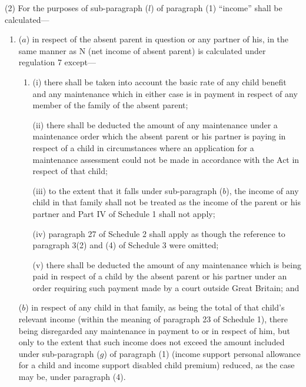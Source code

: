 \documentclass[12pt,a4paper]{article}
\begin{document}
(2) For the purposes of sub-paragraph ($l$) of paragraph (1) “income” shall be calculated—
\begin{enumerate}\item[]
($a$) in respect of the absent parent in question or any partner of his, in the same manner as N (net income of absent parent) is calculated under regulation 7 except—
\begin{enumerate}\item[]
(i) there shall be taken into account the basic rate of any child benefit and any maintenance which in either case is in payment in respect of any member of the family of the absent parent;

(ii) there shall be deducted the amount of any maintenance under a maintenance order which the absent parent or his partner is paying in respect of a child in circumstances where an application for a maintenance assessment could not be made in accordance with the Act in respect of that child; 

(iii) to the extent that it falls under sub-paragraph ($b$), the income of any child in that family shall not be treated as the income of the parent or his partner and Part IV of Schedule 1 shall not apply; 

(iv) paragraph 27 of Schedule 2 shall apply as though the reference to paragraph 3(2) and (4) of Schedule 3 were omitted;

(v) there shall be deducted the amount of any maintenance which is being paid in respect of a child by the absent parent or his partner under an order requiring such payment made by a court outside Great Britain; and
\end{enumerate}

($b$) in respect of any child in that family, as being the total of 
that child’s relevant income (within the meaning of paragraph 23 of Schedule 1), there being disregarded any maintenance in payment to or in respect of him,  %
but only to the extent that such income does not exceed the amount included under sub-paragraph ($g$) of paragraph (1) (income support personal allowance for a child and income support disabled child premium) reduced, as the case may be, under paragraph (4).
\end{enumerate}
\end{document}
